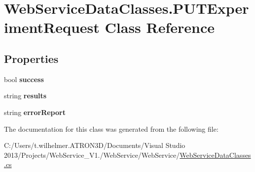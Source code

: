 \hypertarget{class_web_service_data_classes_1_1_p_u_t_experiment_request}{}\section{Web\+Service\+Data\+Classes.\+P\+U\+T\+Experiment\+Request Class Reference}
\label{class_web_service_data_classes_1_1_p_u_t_experiment_request}
\subsection*{Properties}
\begin{DoxyCompactItemize}
\item 
\hypertarget{class_web_service_data_classes_1_1_p_u_t_experiment_request_a48264f0ebe387c66b3ad415913abc566}{}bool {\bfseries success}\label{class_web_service_data_classes_1_1_p_u_t_experiment_request_a48264f0ebe387c66b3ad415913abc566}

\item 
\hypertarget{class_web_service_data_classes_1_1_p_u_t_experiment_request_a7bd9bbbac8fae43695bb32826f3033d9}{}string {\bfseries results}\label{class_web_service_data_classes_1_1_p_u_t_experiment_request_a7bd9bbbac8fae43695bb32826f3033d9}

\item 
\hypertarget{class_web_service_data_classes_1_1_p_u_t_experiment_request_a36d5230e3dc20c88b81b9e32565e085c}{}string {\bfseries error\+Report}\label{class_web_service_data_classes_1_1_p_u_t_experiment_request_a36d5230e3dc20c88b81b9e32565e085c}

\end{DoxyCompactItemize}


The documentation for this class was generated from the following file\+:\begin{DoxyCompactItemize}
\item 
C\+:/\+Users/t.\+wilhelmer.\+A\+T\+R\+O\+N3\+D/\+Documents/\+Visual Studio 2013/\+Projects/\+Web\+Service\+\_\+\+V1./\+Web\+Service/\+Web\+Service/\hyperlink{_web_service_data_classes_8cs}{Web\+Service\+Data\+Classes.\+cs}\end{DoxyCompactItemize}
